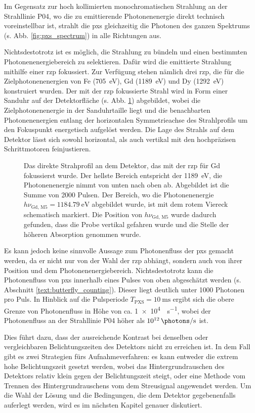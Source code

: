 \noindent
Im Gegensatz zur hoch kollimierten monochromatischen Strahlung an der Strahllinie P04, wo die zu emittierende Photonenenergie direkt technisch voreinstellbar ist, strahlt die \gls{pxs} gleichzeitig die Photonen des ganzen Spektrums (s. Abb. \ref{fig:pxs_spectrum}) in alle Richtungen aus.

\noindent
Nichtsdestotrotz ist es möglich, die Strahlung zu bündeln und einen bestimmten Photonenenergiebereich zu selektieren. Dafür wird die emittierte Strahlung mithilfe einer \gls{rzp} fokussiert. Zur Verfügung stehen nämlich drei \gls{rzp}, die für die Zielphotonenenergien von Fe (\SI{705}{\eV}), Gd (\SI{1189}{\eV}) und Dy (\SI{1292}{\eV}) konstruiert wurden. Der mit der \gls{rzp} fokussierte Strahl wird in Form einer Sanduhr auf der Detektorfläche (s. Abb. \ref{fig:butterfly_moench}) abgebildet, wobei die Zielphotonenenergie in der Sanduhrtaille liegt und die benachbarten Photonenenergien entlang der horizontalen Symmetrieachse des Strahlprofils um den Fokuspunkt energetisch aufgelöst werden. Die Lage des Strahls auf dem Detektor lässt sich sowohl horizontal, als auch vertikal mit den hochpräzisen Schrittmotoren feinjustieren.
\begin{figure}[H]
    \centering
    
    \caption{Das direkte Strahprofil an dem Detektor, das mit der \gls{rzp} für Gd fokussierst wurde. Der hellste Bereich entspricht der \SI{1189}{\eV}, die Photonenenergie nimmt von unten nach oben ab. Abgebildet ist die Summe von 2000 Pulsen. Der Bereich, wo die Photonenenergie $h\nu_{\text{Gd, M5}} = \SI{1184,79}{\eV}$ abgebildet wurde, ist mit dem rotem Viereck schematisch markiert. Die Position von $h\nu_{\text{Gd, M5}}$ wurde dadurch gefunden, dass die Probe vertikal gefahren wurde und die Stelle der höheren Absorption genommen wurde.}
    \label{fig:butterfly_moench}
\end{figure}
\noindent
Es kann jedoch keine sinnvolle Aussage zum Photonenfluss der \gls{pxs} gemacht werden, da er nicht nur von der Wahl der \gls{rzp} abhängt, sondern auch von ihrer Position und dem  Photonenenergiebereich. Nichtsdestotrotz kann die Photonenfluss von \gls{pxs} innerhalb eines Pulses von oben abgeschätzt werden (s. Abschnitt \ref{text:butterfly_counting}). Dieser liegt deutlich unter 1000 Photonen pro Puls. In Hinblick auf die Pulsperiode $T_\text{PXS}=\SI{10}{\milli\second}$ ergibt sich die obere Grenze von Photonenfluss in Höhe von ca. \SI{1e4}{\photons\per\second}, wobei der Photonenfluss an der Strahllinie P04 höher als $\SI{1e12}{\photons\per\second}$ ist.

\noindent
Dies führt dazu, dass der ausreichende Kontrast bei denselben oder vergleichbaren Belichtungszeiten des Detektors nicht zu erreichen ist. In dem Fall gibt es zwei Strategien fürs Aufnahmeverfahren: es kann entweder die extrem hohe Belichtungszeit gesetzt werden, wobei das Hintergrundrauschen des Detektors relativ klein gegen der Belichtungszeit steigt, oder eine Methode vom Trennen des Hintergrundrauschens vom dem Streusignal angewendet werden. Um die Wahl der Lösung und die Bedingungen, die dem Detektor gegebenenfalls auferlegt werden, wird es im nächsten Kapitel genauer diskutiert. 
